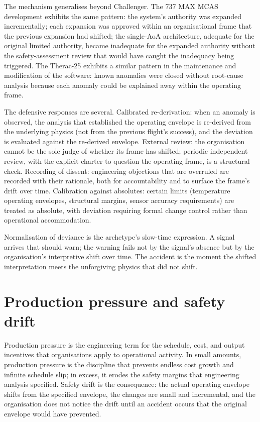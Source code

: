 The mechanism generalises beyond Challenger. The 737 MAX MCAS development \cite{acc:house-737max-2020} exhibits the same pattern: the system's authority was expanded incrementally; each expansion was approved within an organisational frame that the previous expansion had shifted; the single-AoA architecture, adequate for the original limited authority, became inadequate for the expanded authority without the safety-assessment review that would have caught the inadequacy being triggered. The Therac-25 \cite{paper:leveson-turner1993} exhibits a similar pattern in the maintenance and modification of the software: known anomalies were closed without root-cause analysis because each anomaly could be explained away within the operating frame.

The defensive responses are several. Calibrated re-derivation: when an anomaly is observed, the analysis that established the operating envelope is re-derived from the underlying physics (not from the previous flight's success), and the deviation is evaluated against the re-derived envelope. External review: the organisation cannot be the sole judge of whether its frame has shifted; periodic independent review, with the explicit charter to question the operating frame, is a structural check. Recording of dissent: engineering objections that are overruled are recorded with their rationale, both for accountability and to surface the frame's drift over time. Calibration against absolutes: certain limits (temperature operating envelopes, structural margins, sensor accuracy requirements) are treated as absolute, with deviation requiring formal change control rather than operational accommodation.

\begin{archetype}[failure]
Normalisation of deviance is the archetype's slow-time expression. A signal arrives that should warn; the warning fails not by the signal's absence but by the organisation's interpretive shift over time. The accident is the moment the shifted interpretation meets the unforgiving physics that did not shift.
\end{archetype}

\section{Production pressure and safety drift}

Production pressure is the engineering term for the schedule, cost, and output incentives that organisations apply to operational activity. In small amounts, production pressure is the discipline that prevents endless cost growth and infinite schedule slip; in excess, it erodes the safety margins that engineering analysis specified. Safety drift is the consequence: the actual operating envelope shifts from the specified envelope, the changes are small and incremental, and the organisation does not notice the drift until an accident occurs that the original envelope would have prevented.

